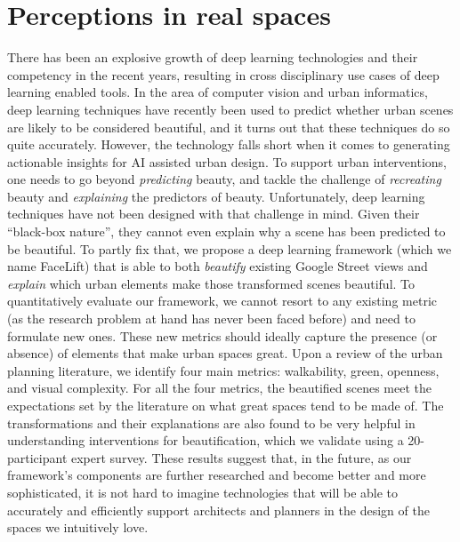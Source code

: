 \chapter{Perceptions in real spaces}


\graphicspath{{Chapter5/plots/} {Chapter5/plots/examples/}}
    
There has been an explosive growth of deep learning technologies and their competency in the recent years, resulting in cross disciplinary use cases of deep learning enabled tools. In the area of computer vision and urban informatics, deep learning techniques have recently been used to predict whether urban scenes are likely to be considered beautiful, and it turns out that these techniques do so quite accurately. However, the technology falls short when it comes to generating actionable insights for AI assisted urban design. To support urban interventions, one needs to go beyond \emph{predicting} beauty, and tackle the challenge of \emph{recreating} beauty and \emph{explaining} the predictors of beauty.  Unfortunately, deep learning techniques have not been designed with that challenge in mind. Given their ``black-box nature'', they cannot even explain why a scene has been predicted to be beautiful. To partly fix that, we propose a deep learning framework (which we name  FaceLift) that is able to both \emph{beautify} existing Google Street views and \emph{explain} which urban elements make those transformed scenes beautiful. To quantitatively evaluate our framework, we cannot resort to any existing metric (as the research problem at hand has never been faced before) and need to  formulate new ones. These new metrics should ideally capture the presence (or absence) of elements that make urban spaces great. Upon a review of the urban planning literature, we identify four main metrics: walkability, green, openness, and visual complexity.  For all the four metrics, the beautified scenes meet the expectations set by the literature on what great spaces tend to be made of. The transformations and their explanations are also found to be very helpful in understanding interventions for beautification, which we validate using a 20-participant expert survey. These results suggest that, in the future, as our framework's components are further researched and become better and more sophisticated, it is not hard to imagine technologies that will be able to accurately and efficiently support architects and planners in the design of the spaces we intuitively love.


